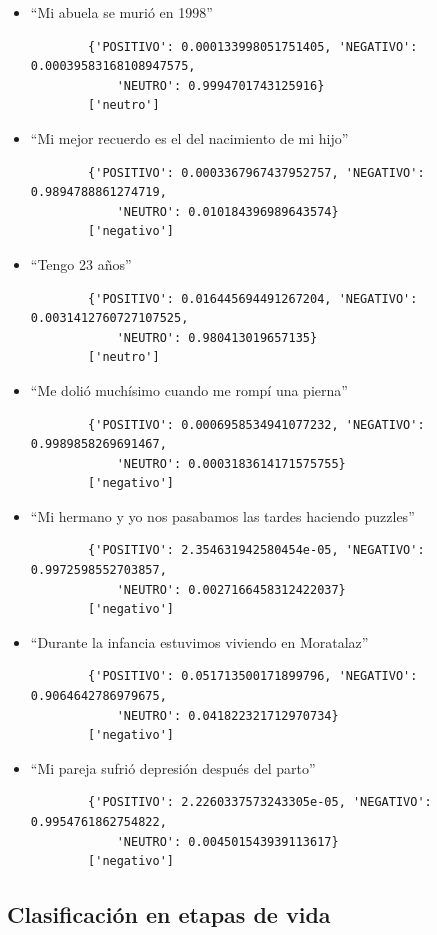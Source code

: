 \begin{itemize}
	\item ``Mi abuela se murió en 1998''
	\begin{verbatim}
		{'POSITIVO': 0.000133998051751405, 'NEGATIVO': 0.00039583168108947575,
			'NEUTRO': 0.9994701743125916}
		['neutro']
	\end{verbatim}
	\item ``Mi mejor recuerdo es el del nacimiento de mi hijo''
	\begin{verbatim}
		{'POSITIVO': 0.0003367967437952757, 'NEGATIVO': 0.9894788861274719, 
			'NEUTRO': 0.010184396989643574}
		['negativo']
	\end{verbatim}
	\item ``Tengo 23 años''
	\begin{verbatim}
		{'POSITIVO': 0.016445694491267204, 'NEGATIVO': 0.0031412760727107525, 
			'NEUTRO': 0.980413019657135}
		['neutro']
	\end{verbatim}
	\item ``Me dolió muchísimo cuando me rompí una pierna''
	\begin{verbatim}
		{'POSITIVO': 0.0006958534941077232, 'NEGATIVO': 0.9989858269691467, 
			'NEUTRO': 0.0003183614171575755}
		['negativo']
	\end{verbatim}
	\item ``Mi hermano y yo nos pasabamos las tardes haciendo puzzles''
	\begin{verbatim}
		{'POSITIVO': 2.354631942580454e-05, 'NEGATIVO': 0.9972598552703857, 
			'NEUTRO': 0.0027166458312422037}
		['negativo']
	\end{verbatim}
	\item ``Durante la infancia estuvimos viviendo en Moratalaz''
	\begin{verbatim}
		{'POSITIVO': 0.051713500171899796, 'NEGATIVO': 0.9064642786979675, 
			'NEUTRO': 0.041822321712970734}
		['negativo']
	\end{verbatim}
	\item ``Mi pareja sufrió depresión después del parto''
	\begin{verbatim}
		{'POSITIVO': 2.2260337573243305e-05, 'NEGATIVO': 0.9954761862754822, 
			'NEUTRO': 0.004501543939113617}
		['negativo']
	\end{verbatim}
	
\end{itemize}


\subsection{Clasificación en etapas de vida}

